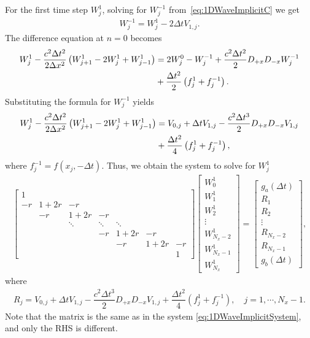 \documentclass[11pt]{article}
\begin{document}
For the first time step $W_j^1$, solving for $W_{j}^{-1}$ from~\eqref{eq:1DWaveImplicitC} we get
\begin{align}
W_{j}^{-1} = W_{j}^{1}-2\Delta t V_{1,j}. 
\end{align} 
The difference equation at $n=0$ becomes
\begin{align}
W_j^{1}-\dfrac{c^2\Delta t^2}{2 \Delta x^2}\left (W_{j+1}^{1}-2W_{j}^{1}+W_{j-1}^{1}\right) & = 2W_j^0-W_j^{-1}+\dfrac{c^2\Delta t^2}{2} D_{+x}D_{-x}W_j^{-1}
\\
&+\dfrac{\Delta t^2}{2}\left(f_j^{1}+f_{j}^{-1}\right). \notag
\end{align}
Substituting the formula for $W_j^{-1}$ yields
\begin{align}
W_j^{1}-\dfrac{c^2\Delta t^2}{2 \Delta x^2}\left (W_{j+1}^{1}-2W_{j}^{1}+W_{j-1}^{1}\right) & = V_{0,j} + \Delta t V_{1,j} - \dfrac{c^2 \Delta t^3}{2}D_{+x}D_{-x}V_{1,j} 
\\
&+\dfrac{\Delta t^2}{4}\left(f_j^{1}+f_{j}^{-1}\right), \notag
\end{align}
where $f_j^{-1}=f(x_j,-\Delta t)$.
Thus, we obtain the system to solve for $W_j^1$
\begin{align}
\begin{bmatrix}
1 & & & & & & \\
-r & 1+2r & -r & & & &\\
& -r & 1+2r & -r & & & \\
& & \ddots & \ddots & \ddots & &\\
& & & -r & 1+2r & -r &\\
& & & & -r & 1+2r & -r\\
& & & & & & 1
\end{bmatrix}\begin{bmatrix}
W_0^{1}\\ W_1^{1}\\ W_2^{1}\\ \vdots \\ W_{N_x-2}^{1} \\W_{N_x-1}^{1} \\ W_{N_x}^{1}
\end{bmatrix}=\begin{bmatrix}
g_a(\Delta t) \\ R_1 \\ R_2 \\ \vdots \\ R_{N_x-2} \\ R_{N_x-1} \\ g_b(\Delta t)
\end{bmatrix},
\end{align}
where
\begin{align}
R_j= V_{0,j} + \Delta t V_{1,j} - \dfrac{c^2 \Delta t^3}{2}D_{+x}D_{-x}V_{1,j} + \dfrac{\Delta t^2}{4}\left(f_j^{1}+f_{j}^{-1}\right), \quad j=1,\cdots, N_x-1.
\end{align}
Note that the matrix is the same as in the system \eqref{eq:1DWaveImplicitSystem}, and only the RHS is different. 
\end{document}
